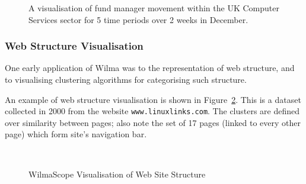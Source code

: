 \documentclass[runningheads]{cl2emult}
\newcommand{\url}[1]{{\small{\tt #1}}}
\begin{document}
\begin{figure}[h]
  \centering
  \caption{A visualisation of fund manager movement within the UK
  Computer Services sector for 5 time periods over 2 weeks in December.}
  \label{fig-fm}
\end{figure}

\subsubsection{Web Structure Visualisation}

One early application of Wilma was to the representation of web structure, and
to visualising clustering algorithms for categorising such
structure\cite{eckersley2kclassiscope}.

An example of web structure visualisation is shown in Figure~\ref{fig-web}.
This is a dataset collected in 2000 from the website \url{www.linuxlinks.com}.
The clusters are defined over similarity between pages; also note the set of
17 pages (linked to every other page) which form site's navigation bar.

\begin{figure}
\begin{center}
 \\
\caption{{\sc WilmaScope Visualisation of Web Site Structure}}
\label{fig-web}
\end{center}
\end{figure}
\end{document}
